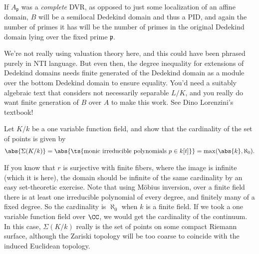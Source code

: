 \begin{remark}

If \(A_{\mathfrak{p}}\) was a \emph{complete} DVR, as opposed to just
some localization of an affine domain, \(B\) will be a semilocal
Dedekind domain and thus a PID, and again the number of primes it has
will be the number of primes in the original Dedekind domain lying over
the fixed prime \(\mathfrak{p}\).

\end{remark}

\begin{remark}

We're not really using valuation theory here, and this could have been
phrased purely in NTI language. But even then, the degree inequality for
extensions of Dedekind domains needs finite generated of the Dedekind
domain as a module over the bottom Dedekind domain to ensure equality.
You'd need a suitably algebraic text that considers not necessarily
separable \(L/K\), and you really do want finite generation of \(B\)
over \(A\) to make this work. See Dino Lorenzini's textbook!

\end{remark}

\begin{exercise}[?]

Let \(K/k\) be a one variable function field, and show that the
cardinality of the set of points is given by
\begin{align*}  
\abs{\Sigma (K/k)} = \abs{\ts{ \text{monic irreducible polynomials } p \in k[t] }}  = \max( \abs{k}, \aleph_0 )
.\end{align*}

\end{exercise}

\begin{remark}

If you know that \(r\) is surjective with finite fibers, where the image
is infinite (which it is here), the domain should be infinite of the
same cardinality by an easy set-theoretic exercise. Note that using
Möbius inversion, over a finite field there is at least one irreducible
polynomial of every degree, and finitely many of a fixed degree. So the
cardinality is \(\aleph_0\) when \(k\) is a finite field. If we took a
one variable function field over \(\CC\), we would get the cardinality
of the continuum. In this case, \(\Sigma(K/k)\) really is the set of
points on some compact Riemann surface, although the Zariski topology
will be too coarse to coincide with the induced Euclidean topology.

\end{remark}

